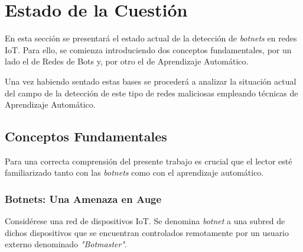 \chapter{Estado de la Cuestión}
\label{cap:estadoDeLaCuestion}

En esta sección se presentará el estado actual de la detección de \textit{botnets} en redes IoT. Para ello, se comienza introduciendo dos conceptos fundamentales, por un lado el de Redes de Bots y, por otro el de Aprendizaje Automático. 


Una vez habiendo sentado estas bases se procederá a analizar la situación actual del campo de la detección de este tipo de redes maliciosas empleando técnicas de Aprendizaje Automático.

\section{Conceptos Fundamentales}
Para una correcta comprensión del presente trabajo es crucial que el lector esté familiarizado tanto con las \textit{botnets} como con el aprendizaje automático.
\subsection{Botnets: Una Amenaza en Auge}
Considérese una red de dispositivos IoT. Se denomina \textit{botnet} a una subred de dichos dispositivos que se encuentran controlados remotamente por un usuario externo denominado \textit{"Botmaster"}.


